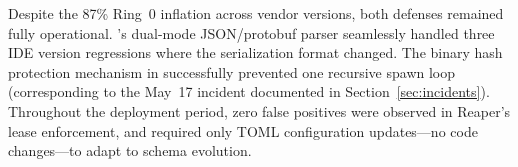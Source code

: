 Despite the 87\% Ring~0 inflation across vendor versions, both defenses remained fully operational. \stls{}'s dual-mode JSON/protobuf parser seamlessly handled three IDE version regressions where the serialization format changed. The binary hash protection mechanism in \stls{} successfully prevented one recursive spawn loop (corresponding to the May~17 incident documented in Section~\ref{sec:incidents}). Throughout the deployment period, zero false positives were observed in Reaper's lease enforcement, and \stls{} required only TOML configuration updates---no code changes---to adapt to schema evolution.

